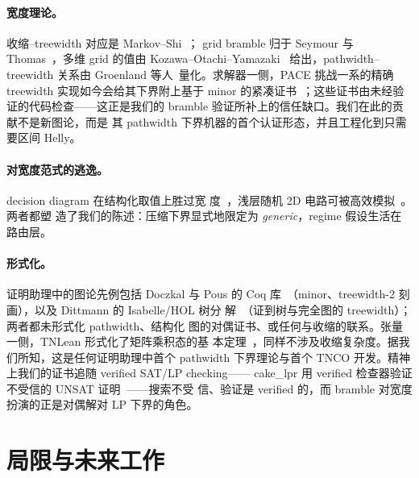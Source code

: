 \documentclass[11pt]{ctexart}
\begin{document}
\paragraph{宽度理论。}收缩--treewidth 对应是 Markov--Shi~\cite{markov2008simulating}；
grid bramble 归于 Seymour 与 Thomas~\cite{seymour1993graph}，多维 grid 的值由
Kozawa--Otachi--Yamazaki~\cite{kozawa2014treewidth} 给出，pathwidth--treewidth 关系由
Groenland 等人~\cite{groenland2023tight}量化。求解器一侧，PACE 挑战一系的精确 treewidth
实现如今会给其下界附上基于 minor 的紧凑证书~\cite{tamaki2022heuristic}；这些证书由未经验
证的代码检查——这正是我们的 bramble 验证所补上的信任缺口。我们在此的贡献不是新图论，而是
其 pathwidth 下界机器的首个认证形态，并且工程化到只需要区间 Helly。

\paragraph{对宽度范式的逃逸。}decision diagram 在结构化取值上胜过宽
度~\cite{dd2025treewidth}，浅层随机 2D 电路可被高效模拟~\cite{napp2022efficient}。两者都塑
造了我们的陈述：压缩下界显式地限定为 \emph{generic}，regime 假设生活在路由层。

\paragraph{形式化。}证明助理中的图论先例包括 Doczkal 与 Pous 的 Coq
库~\cite{doczkal2020graph}（minor、treewidth-2 刻画），以及 Dittmann 的 Isabelle/HOL 树分
解~\cite{dittmann2016tree}（证到树与完全图的 treewidth）；两者都未形式化 pathwidth、结构化
图的对偶证书、或任何与收缩的联系。张量一侧，TNLean 形式化了矩阵乘积态的基
本定理~\cite{tnlean2026}，同样不涉及收缩复杂度。据我们所知，这是任何证明助理中首个
pathwidth 下界理论与首个 TNCO 开发。精神上我们的证书追随 verified SAT/LP checking——
cake\_lpr 用 verified 检查器验证不受信的 UNSAT 证明~\cite{tan2021cakelpr}——搜索不受
信、验证是 verified 的，而 bramble 对宽度扮演的正是对偶解对 LP 下界的角色。

\section{局限与未来工作}\label{sec:limits}
\end{document}

